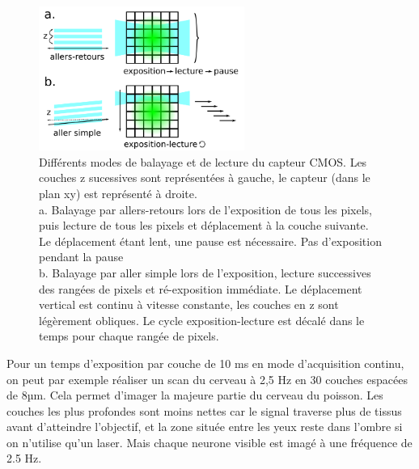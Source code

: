\begin{figure}
\centering
\includegraphics[width=0.6\textwidth]{./files/schema_balayage.svg.png}
\caption{Différents modes de balayage et de lecture du capteur CMOS. Les couches z sucessives sont représentées à gauche, le capteur (dans le plan xy) est représenté à droite.\\
a. Balayage par allers-retours lors de l'exposition de tous les pixels, puis lecture de tous les pixels et déplacement à la couche suivante. Le déplacement étant lent, une pause est nécessaire. Pas d'exposition pendant la pause\\
b. Balayage par aller simple lors de l'exposition, lecture successives des rangées de pixels et ré-exposition immédiate. Le déplacement vertical est continu à vitesse constante, les couches en z sont légèrement obliques. Le cycle exposition-lecture est décalé dans le temps pour chaque rangée de pixels.}
\end{figure}

Pour un temps d'exposition par couche de 10 ms en mode d'acquisition continu, on peut par exemple réaliser un scan du cerveau à 2,5 Hz en 30 couches espacées de 8µm. Cela permet d'imager la majeure partie du cerveau du poisson. Les couches les plus profondes sont moins nettes car le signal traverse plus de tissus avant d'atteindre l'objectif, et la zone située entre les yeux reste dans l'ombre si on n'utilise qu'un laser. Mais chaque neurone visible est imagé à une fréquence de 2.5 Hz.








